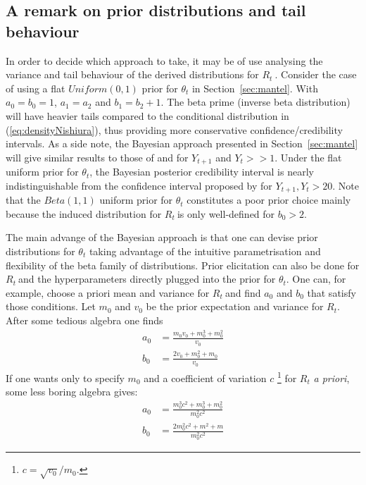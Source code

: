 \documentclass[12pt]{article}
\def \rr {$R_{t}\ $}
\begin{document}
\subsection*{A remark on prior distributions and tail behaviour}
\label{sec:tails}

In order to decide which approach to take, it may be of use analysing the variance and tail behaviour of the derived distributions for \rr. 
Consider the case of using a flat $Uniform(0, 1)$ prior for $\theta_t$ in Section~\ref{sec:mantel}.
With $a_0 = b_0 = 1$, $a_1 = a_2$ and $b_1 = b_2 + 1$.
The beta prime (inverse beta distribution) will have heavier tails compared to the conditional distribution in (\ref{eq:densityNishiura}), thus providing more conservative confidence/credibility intervals.  
As a side note, the Bayesian approach presented in Section~\ref{sec:mantel} will give similar results to those of \citet{wilson} and \citet{wilson} for $Y_{t+1}$ and $Y_t >> 1$.
Under the flat  uniform prior for $\theta_t$, the Bayesian posterior credibility interval is nearly indistinguishable from the confidence interval proposed by \citet{clopper} for $Y_{t+1}, Y_t > 20$.
Note that the $Beta(1, 1)$ uniform prior for $\theta_t$ constitutes a poor prior choice mainly because the induced distribution for \rr is only well-defined for $b_0 > 2$.

The main advange of the Bayesian approach is that one can devise prior distributions for $\theta_t$ taking advantage of the intuitive parametrisation and flexibility of the beta family of distributions.
Prior elicitation can also be done for \rr and the hyperparameters directly plugged into the prior for $\theta_t$. 
One can, for example, choose a priori mean and variance for \rr and find $a_0$ and $b_0$ that satisfy those conditions.
Let $m_0$ and $v_0$ be the prior expectation and variance for $R_t$. 
After some tedious algebra one finds
\begin{align}
\label{eq:elicitation}
a_0 &= \frac{m_0v_0 + m_0^3 + m_0^2}{v_0} \\
b_0 &= \frac{2v_0 + m_0^2 + m_0}{v_0}
\end{align}
If one wants only to specify $m_0$ and a coefficient of variation $c$ \footnote{$c = \sqrt{v_0}/ m_0$.} for $R_t$ \textit{a priori}, some less boring algebra gives:
\begin{align}
\label{eq:elicitationcv}
a_0 &= \frac{m_0^3c^2 + m_0^3 + m_0^2}{m_0^2c^2} \\
b_0 &= \frac{2m_0^2c^2 + m^2 + m}{m_0^2c^2}
\end{align}
\newpage

\end{document}
